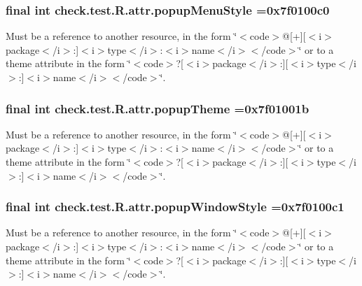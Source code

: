 \subsubsection[{popup\+Menu\+Style}]{\setlength{\rightskip}{0pt plus 5cm}final int check.\+test.\+R.\+attr.\+popup\+Menu\+Style =0x7f0100c0\hspace{0.3cm}{\ttfamily [static]}}\label{classcheck_1_1test_1_1_r_1_1attr_aba44c089874abc974a6e8827efcd53ea}
Must be a reference to another resource, in the form \char`\"{}$<$code$>$@\mbox{[}+\mbox{]}\mbox{[}$<$i$>$package$<$/i$>$\+:\mbox{]}$<$i$>$type$<$/i$>$\+:$<$i$>$name$<$/i$>$$<$/code$>$\char`\"{} or to a theme attribute in the form \char`\"{}$<$code$>$?\mbox{[}$<$i$>$package$<$/i$>$\+:\mbox{]}\mbox{[}$<$i$>$type$<$/i$>$\+:\mbox{]}$<$i$>$name$<$/i$>$$<$/code$>$\char`\"{}. \hypertarget{classcheck_1_1test_1_1_r_1_1attr_a80b43c587b8929227394e17102b18eb4}{}
\subsubsection[{popup\+Theme}]{\setlength{\rightskip}{0pt plus 5cm}final int check.\+test.\+R.\+attr.\+popup\+Theme =0x7f01001b\hspace{0.3cm}{\ttfamily [static]}}\label{classcheck_1_1test_1_1_r_1_1attr_a80b43c587b8929227394e17102b18eb4}
Must be a reference to another resource, in the form \char`\"{}$<$code$>$@\mbox{[}+\mbox{]}\mbox{[}$<$i$>$package$<$/i$>$\+:\mbox{]}$<$i$>$type$<$/i$>$\+:$<$i$>$name$<$/i$>$$<$/code$>$\char`\"{} or to a theme attribute in the form \char`\"{}$<$code$>$?\mbox{[}$<$i$>$package$<$/i$>$\+:\mbox{]}\mbox{[}$<$i$>$type$<$/i$>$\+:\mbox{]}$<$i$>$name$<$/i$>$$<$/code$>$\char`\"{}. \hypertarget{classcheck_1_1test_1_1_r_1_1attr_a0ec5c2b453be6a2be04aa78dce81d0b6}{}
\subsubsection[{popup\+Window\+Style}]{\setlength{\rightskip}{0pt plus 5cm}final int check.\+test.\+R.\+attr.\+popup\+Window\+Style =0x7f0100c1\hspace{0.3cm}{\ttfamily [static]}}\label{classcheck_1_1test_1_1_r_1_1attr_a0ec5c2b453be6a2be04aa78dce81d0b6}
Must be a reference to another resource, in the form \char`\"{}$<$code$>$@\mbox{[}+\mbox{]}\mbox{[}$<$i$>$package$<$/i$>$\+:\mbox{]}$<$i$>$type$<$/i$>$\+:$<$i$>$name$<$/i$>$$<$/code$>$\char`\"{} or to a theme attribute in the form \char`\"{}$<$code$>$?\mbox{[}$<$i$>$package$<$/i$>$\+:\mbox{]}\mbox{[}$<$i$>$type$<$/i$>$\+:\mbox{]}$<$i$>$name$<$/i$>$$<$/code$>$\char`\"{}. \hypertarget{classcheck_1_1test_1_1_r_1_1attr_ae85e01112339734f60777fb376eb7e67}{}
